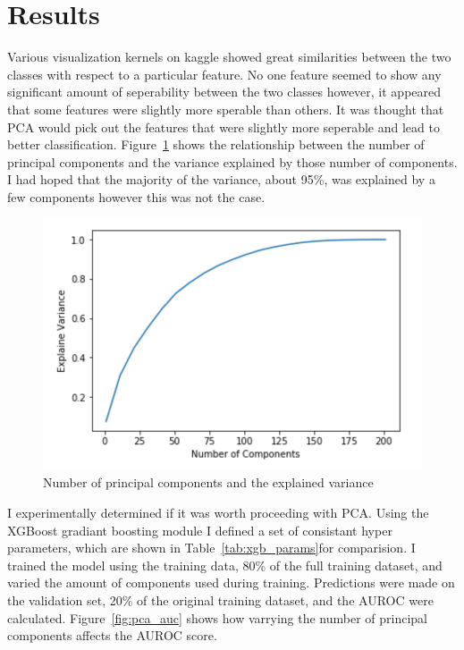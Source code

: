 \documentclass[11pt,letterpaper]{article}
\begin{document}
\fi

\section{Results}

Various visualization kernels on kaggle showed great similarities
between the two classes with respect to a particular feature.  No one feature
seemed to show any significant amount of seperability between the two classes
however, it appeared that some features were slightly more sperable than others.
It was thought that PCA would pick out the features that were slightly more
seperable and lead to better classification.
Figure~\ref{fig:pca_explain} shows the relationship between the number of
principal components and the variance explained by those number of components.
I had hoped that the majority of the variance, about 95\%, was explained by a
few components however this was not the case.

\begin{figure}[h!]
    \centering
        \includegraphics[width=.5\textwidth]{pca_explain.png}
        \caption{Number of principal components and the explained variance}
        \label{fig:pca_explain}
\end{figure}

I experimentally determined if it was worth proceeding with PCA.  Using the
XGBoost gradiant boosting module I defined a set of consistant hyper parameters,
which are shown in Table~\ref{tab:xgb_params}for comparision.  I trained the
model using the training data, 80\% of the full training dataset, and varied the
amount of components used during training. Predictions were made on the
validation set, 20\% of the original training dataset, and the AUROC were
calculated.  Figure~\ref{fig:pca_auc} shows how varrying the number of principal
components affects the AUROC score. 

\begin{table}[h!]
\centering
\caption{XGBoost parameters}
\label{tab:xgb_params}
\end{table}
\end{document}
